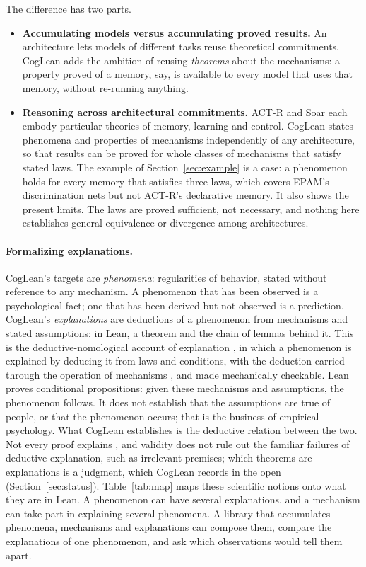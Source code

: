 \documentclass[11pt]{article}
\begin{document}
The difference has two parts.
\begin{itemize}
  \item \textbf{Accumulating models versus accumulating proved results.} An architecture lets models of different tasks reuse theoretical commitments. CogLean adds the ambition of reusing \emph{theorems} about the mechanisms: a property proved of a memory, say, is available to every model that uses that memory, without re-running anything.
  \item \textbf{Reasoning across architectural commitments.} ACT-R and Soar each embody particular theories of memory, learning and control. CogLean states phenomena and properties of mechanisms independently of any architecture, so that results can be proved for whole classes of mechanisms that satisfy stated laws. The example of Section~\ref{sec:example} is a case: a phenomenon holds for every memory that satisfies three laws, which covers EPAM's discrimination nets but not ACT-R's declarative memory. It also shows the present limits. The laws are proved sufficient, not necessary, and nothing here establishes general equivalence or divergence among architectures.
\end{itemize}

\paragraph{Formalizing explanations.} CogLean's targets are \emph{phenomena}: regularities of behavior, stated without reference to any mechanism. A phenomenon that has been observed is a psychological fact; one that has been derived but not observed is a prediction. CogLean's \emph{explanations} are deductions of a phenomenon from mechanisms and stated assumptions: in Lean, a theorem and the chain of lemmas behind it. This is the deductive-nomological account of explanation \citep{hempel1948}, in which a phenomenon is explained by deducing it from laws and conditions, with the deduction carried through the operation of mechanisms \citep{machamer2000}, and made mechanically checkable. Lean proves conditional propositions: given these mechanisms and assumptions, the phenomenon follows. It does not establish that the assumptions are true of people, or that the phenomenon occurs; that is the business of empirical psychology. What CogLean establishes is the deductive relation between the two. Not every proof explains \citep{steiner1978}, and validity does not rule out the familiar failures of deductive explanation, such as irrelevant premises; which theorems are explanations is a judgment, which CogLean records in the open (Section~\ref{sec:status}). Table~\ref{tab:map} maps these scientific notions onto what they are in Lean. A phenomenon can have several explanations, and a mechanism can take part in explaining several phenomena. A library that accumulates phenomena, mechanisms and explanations can compose them, compare the explanations of one phenomenon, and ask which observations would tell them apart.
\end{document}
